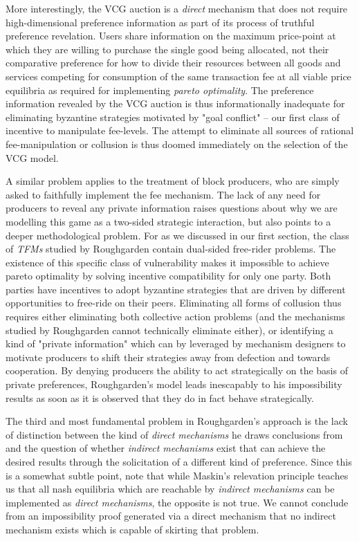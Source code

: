 \documentclass[sigconf,anonymous]{aamas}
\begin{document}
More interestingly, the VCG auction is a \textit{direct} mechanism that does not require high-dimensional preference information as part of its process of truthful preference revelation. Users share information on the maximum price-point at which they are willing to purchase the single good being allocated, not their comparative preference for how to divide their resources between all goods and services competing for consumption of the same transaction fee at all viable price equilibria as required for implementing \textit{pareto optimality}. The preference information revealed by the VCG auction is thus informationally inadequate for eliminating byzantine strategies motivated by "goal conflict" -- our first class of incentive to manipulate fee-levels. The attempt to eliminate all sources of rational fee-manipulation or collusion is thus doomed immediately on the selection of the VCG model.

A similar problem applies to the treatment of block producers, who are simply asked to faithfully implement the fee mechanism. The lack of any need for producers to reveal any private information raises questions about why we are modelling this game as a two-sided strategic interaction, but also points to a deeper methodological problem. For as we discussed in our first section, the class of \textit{TFMs} studied by Roughgarden contain dual-sided free-rider problems. The existence of this specific class of vulnerability makes it impossible to achieve pareto optimality by solving incentive compatibility for only one party. Both parties have incentives to adopt byzantine strategies that are driven by different opportunities to free-ride on their peers. Eliminating all forms of collusion thus requires either eliminating both collective action problems (and the mechanisms studied by Roughgarden cannot technically eliminate either), or identifying a kind of "private information" which can by leveraged by mechanism designers to motivate producers to shift their strategies away from defection and towards cooperation. By denying producers the ability to act strategically on the basis of private preferences, Roughgarden's model leads inescapably to his impossibility results as soon as it is observed that they do in fact behave strategically.

The third and most fundamental problem in Roughgarden's approach is the lack of distinction between the kind of \textit{direct mechanisms} he draws conclusions from and the question of whether \textit{indirect mechanisms} exist that can achieve the desired results through the solicitation of a different kind of preference. Since this is a somewhat subtle point, note that while Maskin's relevation principle teaches us that all nash equilibria which are reachable by \textit{indirect mechanisms} can be implemented as \textit{direct mechanisms}, the opposite is not true. We cannot conclude from an impossibility proof generated via a direct mechanism that no indirect mechanism exists which is capable of skirting that problem.
\end{document}
